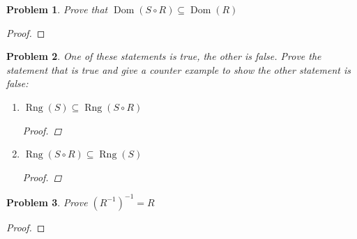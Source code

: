 \documentclass[12pt]{article}
\DeclareMathOperator{\rng}{Rng}
\DeclareMathOperator{\dom}{Dom}
\newcommand{\cont}{\subseteq}
\newtheorem{problem}{Problem}
\begin{document}
\begin{problem} Prove that $\dom(S \circ R ) \cont \dom(R)$
\end{problem}
\begin{proof}

\end{proof}
\begin{problem}
One of these statements is true, the other is false. Prove the statement that is true and give a counter example to show the other statement is false:
\begin{enumerate}
\item $\rng(S) \cont \rng(S \circ R)$
\begin{proof}

\end{proof}
\item $\rng(S \circ R) \cont \rng(S)$
\begin{proof}

\end{proof}
\end{enumerate}
\end{problem}

\begin{problem}
Prove $(R^{-1})^{-1} = R$
\end{problem}
\begin{proof}

\end{proof}
 
\end{document}
